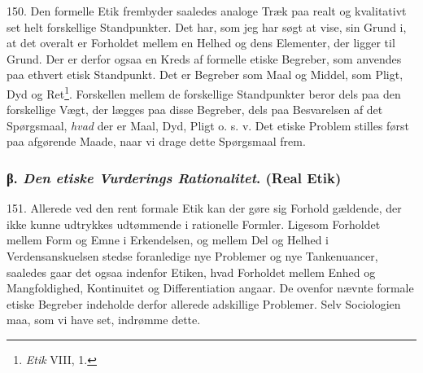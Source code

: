 \documentclass[12pt,a4paper]{book}
\newcommand{\apage}[1]{\marginnote{\footnotesize\textit{[#1]}}}
\begin{document}
150. Den formelle Etik frembyder saaledes analoge Træk \apage{359} paa realt og kvalitativt set helt
forskellige Standpunkter. Det har, som jeg har søgt at vise, sin Grund i, at det overalt er
Forholdet mellem en Helhed og dens Elementer, der ligger til Grund. Der er derfor ogsaa en
Kreds af formelle etiske Begreber, som anvendes paa ethvert etisk Standpunkt. Det er
Begreber som Maal og Middel, som Pligt, Dyd og Ret\footnote{\emph{Etik} VIII, 1.}.
Forskellen mellem de forskellige Standpunkter beror dels paa den forskellige Vægt, der
lægges paa disse Begreber, dels paa Besvarelsen af det Spørgsmaal, \emph{hvad} der er Maal,
Dyd, Pligt o. s. v. Det etiske Problem stilles først paa afgørende Maade, naar vi drage
dette Spørgsmaal frem.

\subsubsection*{β. \emph{Den etiske Vurderings Rationalitet}. (Real Etik)}

151. Allerede ved den rent formale Etik kan der gøre sig Forhold gældende, der ikke kunne
udtrykkes udtømmende i rationelle Formler. Ligesom Forholdet mellem Form og Emne i
Erkendelsen, og mellem Del og Helhed i Verdensanskuelsen stedse foranledige nye Problemer
og nye Tankenuancer, saaledes gaar det ogsaa indenfor Etiken, hvad Forholdet mellem Enhed
og Mangfoldighed, Kontinuitet og Differentiation angaar. De ovenfor nævnte formale etiske
Begreber indeholde derfor allerede adskillige Problemer. Selv Sociologien maa, som vi have
set, indrømme dette.
\end{document}

